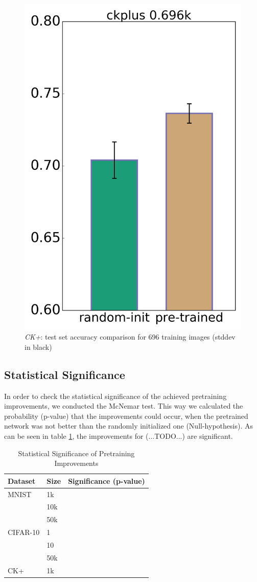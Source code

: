\documentclass{article}
\begin{document}
    \begin{figure}
      \centering
      \includegraphics[width=0.33\linewidth]{../box_plots/boxplots_ckplus.png}
      \caption{\emph{CK+}: test set accuracy comparison for 696 training images (stddev in black)}
      \label{fig:ckplus_plot}
    \end{figure}

  \subsection{Statistical Significance}
    In order to check the statistical significance of the achieved pretraining improvements, we conducted the McNemar test. This way we calculated the probability (p-value) that the improvements could occur, when the pretrained network was not better than the randomly initialized one (Null-hypothesis).
    As can be seen in table \ref{table:significance}, the improvements for (...TODO...) are significant.
    \begin{table}
      \caption{Statistical Significance of Pretraining Improvements}
      \label{table:significance}
      \centering
      \begin{tabular}{lll}
        \toprule
        Dataset     & Size     & Significance (p-value) \\
        \midrule
        MNIST & 1k  &     \\
        & 10k  &      \\
        & 50k  &     \\
        \midrule
        CIFAR-10     & 1 &     \\
        & 10 &      \\
        & 50k &      \\
        \midrule
        CK+     & 1k      &  \\
        \bottomrule
      \end{tabular}
    \end{table}
\end{document}

